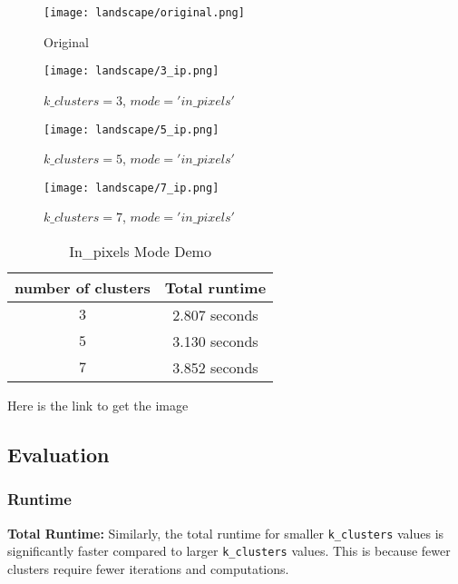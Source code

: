 \begin{figure}[htbp]
    \centering
    \begin{minipage}{0.45\textwidth}
        \centering
        \texttt{[image: landscape/original.png]}
        \caption{Original}
    \end{minipage}\hfill
    \begin{minipage}{0.45\textwidth}
        \centering
        \texttt{[image: landscape/3\_ip.png]}
        \caption{$k\_clusters = 3$, $mode = 'in\_pixels'$}
    \end{minipage}
    
    \vspace{0.5cm} %
    
    \begin{minipage}{0.45\textwidth}
        \centering
        \texttt{[image: landscape/5\_ip.png]}
        \caption{$k\_clusters = 5$, $mode = 'in\_pixels'$}
    \end{minipage}\hfill
    \begin{minipage}{0.45\textwidth}
        \centering
        \texttt{[image: landscape/7\_ip.png]}
        \caption{$k\_clusters = 7$, $mode = 'in\_pixels'$}
    \end{minipage}
\end{figure}

\begin{table}[htbp]
    \centering
    \begin{tabular}{|c|c|}
        \hline
        \textbf{number of clusters} & \textbf{Total runtime} \\
        \hline
        $ 3$ & 2.807 seconds \\
        \hline
        $5$ & 3.130 seconds \\
        \hline
        $7$ & 3.852 seconds \\
        \hline
    \end{tabular}
    \caption{In\_pixels Mode Demo}
    \label{tab:in_pixels_mode}
\end{table}
\quad Here is the link to get the image \cite{landscapeimage}

\subsection{Evaluation}

\subsubsection{Runtime}
\begin{itemize}
    
     \textbf{Total Runtime:} Similarly, the total runtime for smaller \texttt{k\_clusters} values is significantly faster compared to larger \texttt{k\_clusters} values. This is because fewer clusters require fewer iterations and computations.
\end{itemize}

